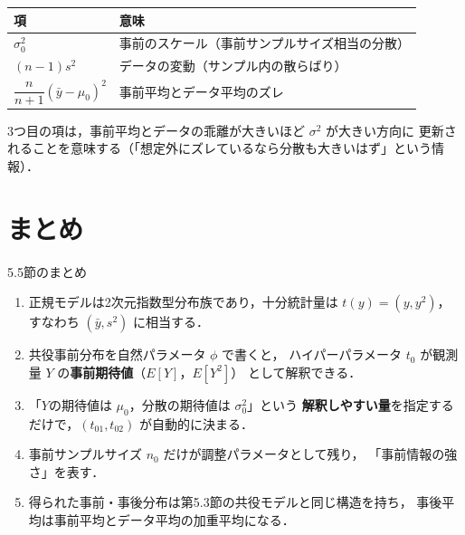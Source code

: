 \documentclass[lualatex,ja=standard,a4paper,12pt]{bxjsarticle}
\begin{document}
\medskip
\begin{center}
\renewcommand{\arraystretch}{1.5}
\begin{tabular}{ll}
\toprule
項 & 意味 \\
\midrule
$\sigma_0^2$ & 事前のスケール（事前サンプルサイズ相当の分散） \\
$(n-1)s^2$ & データの変動（サンプル内の散らばり） \\
$\dfrac{n}{n+1}(\bar{y}-\mu_0)^2$ & 事前平均とデータ平均のズレ \\
\bottomrule
\end{tabular}
\end{center}

\medskip
3つ目の項は，事前平均とデータの乖離が大きいほど $\sigma^2$ が大きい方向に
更新されることを意味する（「想定外にズレているなら分散も大きいはず」という情報）．

\section{まとめ}

\begin{thmbox}{5.5節のまとめ}
\begin{enumerate}
  \item 正規モデルは2次元指数型分布族であり，十分統計量は $t(y) = (y, y^2)$，
        すなわち $(\bar{y}, s^2)$ に相当する．

  \item 共役事前分布を自然パラメータ $\phi$ で書くと，
        ハイパーパラメータ $t_0$ が観測量 $Y$ の\textbf{事前期待値}（$E[Y]$，$E[Y^2]$）
        として解釈できる．

  \item 「$Y$の期待値は $\mu_0$，分散の期待値は $\sigma_0^2$」という
        \textbf{解釈しやすい量}を指定するだけで，$(t_{01}, t_{02})$ が自動的に決まる．

  \item 事前サンプルサイズ $n_0$ だけが調整パラメータとして残り，
        「事前情報の強さ」を表す．

  \item 得られた事前・事後分布は第5.3節の共役モデルと同じ構造を持ち，
        事後平均は事前平均とデータ平均の加重平均になる．
\end{enumerate}
\end{thmbox}
\end{document}
